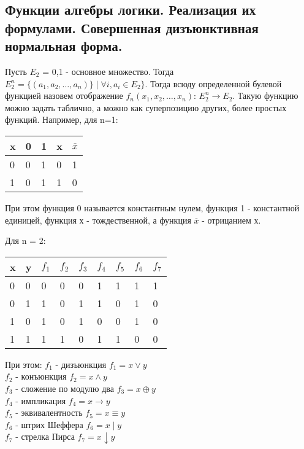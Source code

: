 \subsection{Функции алгебры логики. Реализация их формулами. Совершенная дизъюнктивная нормальная форма.}

Пусть $E_{2}$ = {0,1} - основное множество. Тогда $E^n_{2} = \{(a_{1}, a_{2}, \ldots, a_{n}) \} \mid \forall i, a_{i} \in E_{2}\}$. Тогда всюду определенной булевой функцией назовем отображение $f_{n}(x_{1}, x_{2}, \ldots, x_{n})$: $E^n_{2} \rightarrow E_{2}$. Такую функцию можно задать таблично, а можно как суперпозицию других, более простых функций. Например, для n=1: \\

\begin{tabular}{ l | l l l l}
x & 0 & 1 & x & $\overline{x}$ \\
\hline
0 & 0 & 1 & 0 & 1\\
1 & 0 & 1 & 1 & 0\\
\end{tabular}


При этом функция 0 называется константным нулем, функция 1 - константной единицей, функция х - тождественной, а функция $\overline{x}$ - отрицанием х.  

Для n = 2: \\
\begin{tabular}{ l l | l l l l l l l}
x & y & $f_{1}$ & $f_{2}$ & $f_{3}$ & $f_{4}$ & $f_{5}$ & $f_{6}$ & $f_{7}$ \\
\hline
0 & 0 & 0 & 0 & 0 & 1 & 1 & 1 & 1 \\
0 & 1 & 1 & 0 & 1 & 1 & 0 & 1 & 0 \\
1 & 0 & 1 & 0 & 1 & 0 & 0 & 1 & 0 \\
1 & 1 & 1 & 1 & 0 & 1 & 1 & 0 & 0 \\
\end{tabular}

При этом: 
$f_{1}$ - дизъюнкция $f_{1} = x \vee y$\\
$f_{2}$ - конъюнкция $f_{2} = x \wedge y$ \\
$f_{3}$ - сложение по модулю два $f_{3} = x \oplus y$ \\
$f_{4}$ - импликация $f_{4} = x \rightarrow y$ \\
$f_{5}$ - эквивалентность $f_{5} = x \equiv y$\\
$f_{6}$ - штрих Шеффера $f_{6} = x \mid y$ \\
$f_{7}$ - стрелка Пирса $f_{7} = x \downarrow y$ \\

